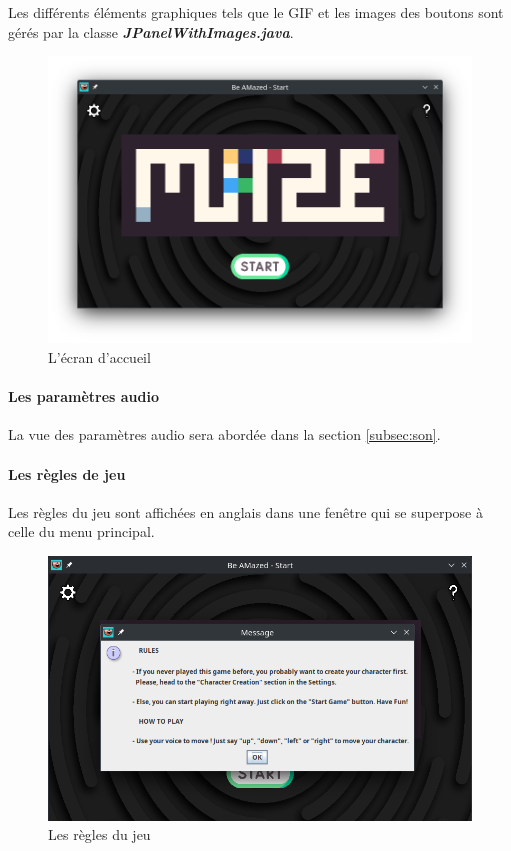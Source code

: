 Les différents éléments graphiques tels que le GIF et les images des boutons sont gérés par la classe \textbf{\textit{JPanelWithImages.java}}.

\begin{figure}[h!]
    \centering
    \includegraphics[scale=0.4]{ressources/Implementation/Labyrinthe/Controleur/StartMenu.png}%
    \caption{L'écran d'accueil}
    \label{fig:StartMenu}
\end{figure}
\FloatBarrier

\paragraph{Les paramètres audio}

La vue des paramètres audio sera abordée dans la section \ref{subsec:son}.

\paragraph{Les règles de jeu}

Les règles du jeu sont affichées en anglais dans une fenêtre qui se superpose à celle du menu principal.

\begin{figure}[h!]
    \centering
    \includegraphics[scale=0.4]{ressources/Implementation/Labyrinthe/Controleur/Rules.png}%
    \caption{Les règles du jeu}
    \label{fig:Rules}
\end{figure}
\FloatBarrier


